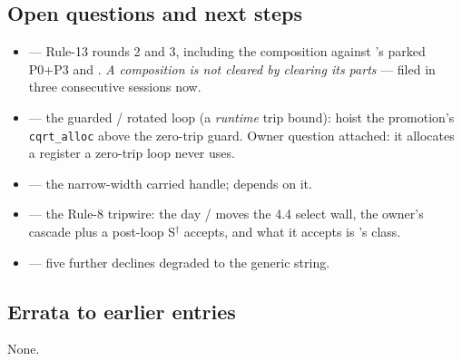 \subsection*{Open questions and next steps}
\begin{itemize}
  \item {} --- Rule-13 rounds 2 and 3, including the composition against 's parked
        P0+P3 and . \emph{A composition is not cleared by clearing its parts} --- filed in
        three consecutive sessions now.
  \item {} --- the guarded / rotated loop (a \emph{runtime} trip bound): hoist the promotion's
        \texttt{cqrt\_alloc} above the zero-trip guard. Owner question attached: it allocates a
        register a zero-trip loop never uses.
  \item {} --- the narrow-width carried handle;  depends on it.
  \item {} --- the Rule-8 tripwire: the day / moves the 4.4 select wall, the
        owner's cascade plus a post-loop S$^\dagger$ accepts, and what it accepts is 's class.
  \item {} --- five further declines degraded to the generic string.
\end{itemize}

\subsection*{Errata to earlier entries}
None.
